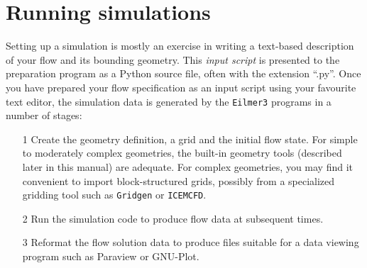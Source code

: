 \section{Running simulations}
%
Setting up a simulation is mostly an exercise in writing a text-based 
description of your flow and its bounding geometry.
This \textit{input script} is presented to the preparation program as 
a Python source file, often with the extension ``.py''.
Once you have prepared your flow specification as an input script using your favourite text editor, 
the simulation data is generated by the \texttt{Eilmer3} programs in a number of stages:
\begin{itemize}
\item[1] Create the geometry definition, a grid and the initial flow state.
  For simple to moderately complex geometries, the built-in geometry tools (described later in this manual)
  are adequate.
  For complex geometries, you may find it convenient to import block-structured grids, 
  possibly from a specialized gridding tool such as \texttt{Gridgen} or \texttt{ICEMCFD}.
\item[2] Run the simulation code to produce flow data at subsequent times.
\item[3] Reformat the flow solution data to produce files suitable for a data viewing program such as Paraview or GNU-Plot.
\end{itemize}

\newpage
